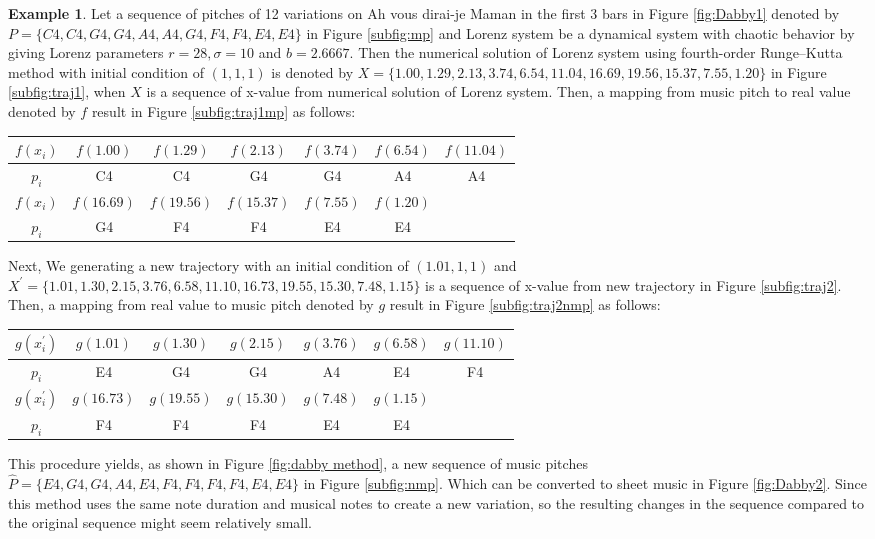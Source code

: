 \documentclass[11pt]{article}
\theoremstyle{definition}
\newtheorem{example}[theorem]{Example}
\begin{document}
\begin{example}
Let a sequence of pitches of 12 variations on Ah vous dirai-je Maman \cite{hinson_12_1987} in the first 3 bars in Figure \ref{fig:Dabby1} denoted by $P = \{C4, C4, G4, G4, A4, A4, G4, F4, F4, E4, E4 \}$ in Figure \ref{subfig:mp} and Lorenz system be a dynamical system with chaotic behavior by giving Lorenz parameters $r = 28, \sigma=10$ and $b = 2.6667 $. Then the numerical solution of Lorenz system using fourth-order Runge–Kutta method with initial condition of $(1,1,1)$ is denoted by $X = \{1.00, 1.29, 2.13, 3.74, 6.54, 11.04, 16.69, 19.56, 15.37, 7.55, 1.20\}$ in Figure \ref{subfig:traj1}, when $X$ is a sequence of x-value from numerical solution of Lorenz system. Then, a mapping from music pitch to real value denoted by $f$ result in Figure \ref{subfig:traj1mp} as follows:

\begin{center}
\begin{tabular}{|c||c|c|c|c|c|c|}
\hline
$f(x_i)$ & $f(1.00)$ & $f(1.29)$ & $f(2.13)$ & $f(3.74)$ & $f(6.54)$ & $f(11.04)$ \\
\hline
$p_i$ & C4 & C4 & G4 & G4 & A4 & A4 \\
\hline
$f(x_i)$ & $f(16.69)$ & $f(19.56)$ & $f(15.37)$ & $f(7.55)$ & $f(1.20)$ & \\
\hline
$p_i$ & G4 & F4 & F4 & E4 & E4 &  \\
\hline
\end{tabular}
\end{center}

Next, We generating a new trajectory with an initial condition of $(1.01,1,1)$ and $X^\prime = \{ 1.01, 1.30, 2.15, 3.76, 6.58, 11.10, 16.73, 19.55, 15.30, 7.48, 1.15 \} $ is a sequence of x-value from new trajectory in Figure \ref{subfig:traj2}. Then, a mapping from real value to music pitch denoted by $g$ result in Figure \ref{subfig:traj2nmp} as follows:

\begin{center}
\begin{tabular}{|c||c|c|c|c|c|c|}
\hline
$g(x^\prime_i)$ & $g(1.01)$ & $g(1.30)$ & $g(2.15)$ & $g(3.76)$ & $g(6.58)$ & $g(11.10)$ \\
\hline
$p_i$ & E4 & G4 & G4 & A4 & E4 & F4 \\
\hline
$g(x^\prime_i)$ & $g(16.73)$ & $g(19.55)$ & $g(15.30)$ & $g(7.48)$ & $g(1.15)$ & \\
\hline
$p_i$ & F4 & F4 & F4 & E4 & E4 &  \\
\hline
\end{tabular}
\end{center}
This procedure yields, as shown in Figure \ref{fig:dabby method}, a new sequence of music pitches \\ $\hat{P} =\{E4, G4, G4, A4, E4, F4, F4, F4, F4, E4, E4 \}$ in Figure \ref{subfig:nmp}. Which can be converted to sheet music in Figure \ref{fig:Dabby2}. Since this method uses the same note duration and musical notes to create a new variation, so the resulting changes in the sequence compared to the original sequence might seem relatively small.
\end{example}
\end{document}
